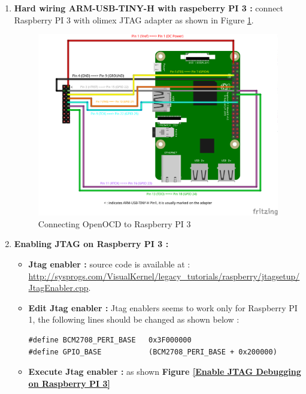 \begin{enumerate}
		\begin{enumerate}
			\item \textbf{Hard wiring ARM-USB-TINY-H with raspeberry PI 3 : } connect Raspberry PI 3 with olimex JTAG adapter as shown in {Figure \ref{Connecting OpenOCD to Raspberry PI 3}}.
				\begin{figure}[H]
					\centering
        				\includegraphics[scale=0.55]{img/solution/raspberry-PI-3-openocd-wiring.png}
        				\caption{Connecting OpenOCD to Raspberry PI 3}
        				\label{Connecting OpenOCD to Raspberry PI 3}
    			\end{figure}
    	
    		\item \textbf{Enabling JTAG on Raspberry PI 3 : }
    			\begin{itemize}
    				\item \textbf{Jtag enabler : } source code is available at : {\color{blue}\url{http://sysprogs.com/VisualKernel/legacy\_tutorials/raspberry/jtagsetup/JtagEnabler.cpp}}.
    				
    				\item \textbf{Edit Jtag enabler : } Jtag enablers seems to work only for Raspberry PI 1, the following lines should be changed as shown below :

		\begin{lstlisting}[style=CStyle]
#define BCM2708_PERI_BASE	0x3F000000
#define GPIO_BASE			(BCM2708_PERI_BASE + 0x200000)
		\end{lstlisting}
					\item \textbf{Execute Jtag enabler : } as shown \textbf{Figure \ref{Enable JTAG Debugging on Raspberry PI 3}}
					


\end{itemize}
\end{enumerate}
\end{enumerate}
